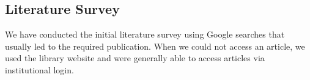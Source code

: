 \subsection{Literature Survey}

We have conducted the initial literature survey using Google searches that usually led to the required publication. When we could not access an article, we used the library website and were generally able to access articles via institutional login. 